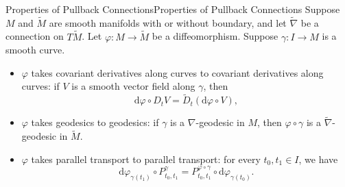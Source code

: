 \documentclass[../main.tex]{subfiles}
\begin{document}
\begin{proposition}{Properties of Pullback Connections}{Properties of Pullback Connections}
	Suppose $M$ and $\tilde{M}$ are smooth manifolds with or without boundary, and let $\tilde{\nabla}$ be a connection on $T\tilde{M}$. Let $\varphi:M\to \tilde{M}$ be a diffeomorphism. Suppose $\gamma: I \to M$ is a smooth curve.
	\begin{itemize}
		\item $\varphi$ takes covariant derivatives along curves to covariant derivatives along curves: if $V$ is a smooth vector field along $\gamma$, then
		  \begin{equation}
		    \mathrm{d} \varphi \circ D_t V = \tilde{D}_t (\mathrm{d} \varphi \circ V),
		  \end{equation}
		\item $\varphi$ takes geodesics to geodesics: if $\gamma$ is a $\nabla$-geodesic in $M$, then $\varphi \circ \gamma$ is a $\tilde{\nabla}$-geodesic in $\tilde{M}$.
		\item $\varphi$ takes parallel transport to parallel transport: for every $t_0, t_1 \in I$, we have
			\begin{equation}
				\mathrm{d} \varphi_{\gamma(t_1)} \circ P_{t_0, t_1}^{\gamma} = P_{t_0, t_1}^{\varphi \circ \gamma} \circ \mathrm{d} \varphi_{\gamma(t_0)}.
			\end{equation}
	\end{itemize}
\end{proposition}
\end{document}
